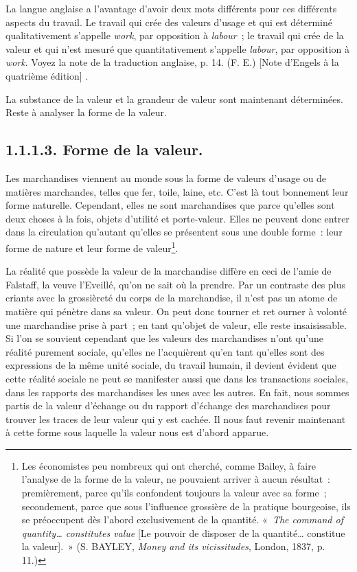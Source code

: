 \documentclass[french,twoside]{book} %
\begin{document}
{ La langue anglaise a l’avantage d’avoir deux mots différents pour ces différents aspects du travail. Le travail qui crée des valeurs d’usage et qui est déterminé qualitativement s’appelle \emph{work}, par opposition à \emph{labour} ; le travail qui crée de la valeur et qui n’est mesuré que quantitativement s’appelle \emph{labour}, par opposition à \emph{work}. Voyez la note de la traduction anglaise, p. 14. (F. E.) [Note d’Engels à la quatrième édition]
}.\par
La substance de la valeur et la grandeur de valeur sont maintenant déterminées. Reste à analyser la forme de la valeur.
\subsection[{1.1.1.3. Forme de la valeur.}]{1.1.1.3. Forme de la valeur.}
\noindent Les marchandises viennent au monde sous la forme de valeurs d’usage ou de matières marchandes, telles que fer, toile, laine, etc. C’est là tout bonnement leur forme naturelle. Cependant, elles ne sont marchandises que parce qu’elles sont deux choses à la fois, objets d’utilité et porte-valeur. Elles ne peuvent donc entrer dans la circulation qu’autant qu’elles se présentent sous une double forme : leur forme de nature et leur forme de valeur\footnote{Les économistes peu nombreux qui ont cherché, comme Bailey, à faire l’analyse de la forme de la valeur, ne pouvaient arriver à aucun résultat : premièrement, parce qu’ils confondent toujours la valeur avec sa forme ; secondement, parce que sous l’influence grossière de la pratique bourgeoise, ils se préoccupent dès l’abord exclusivement de la quantité. « \emph{The command of quantity… constitutes value} [Le pouvoir de disposer de la quantité… constitue la valeur]. » (S. BAYLEY, \emph{Money and its vicissitudes}, London, 1837, p. 11.)}.\par
La réalité que possède la valeur de la marchandise diffère en ceci de l’amie de Falstaff, la veuve l’Eveillé, qu’on ne sait où la prendre. Par un contraste des plus criants avec la grossièreté du corps de la marchandise, il n’est pas un atome de matière qui pénètre dans sa valeur. On peut donc tourner et ret ourner à volonté une marchandise prise à part ; en tant qu’objet de valeur, elle reste insaisissable. Si l’on se souvient cependant que les valeurs des marchandises n’ont qu’une réalité purement sociale, qu’elles ne l’acquièrent qu’en tant qu’elles sont des expressions de la même unité sociale, du travail humain, il devient évident que cette réalité sociale ne peut se manifester aussi que dans les transactions sociales, dans les rapports des marchandises les unes avec les autres. En fait, nous sommes partis de la valeur d’échange ou du rapport d’échange des marchandises pour trouver les traces de leur valeur qui y est cachée. Il nous faut revenir maintenant à cette forme sous laquelle la valeur nous est d’abord apparue.\par
\end{document}
